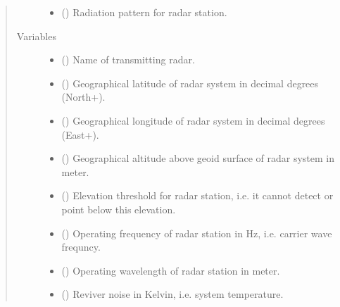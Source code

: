 \documentclass[letterpaper,10pt,english]{sphinxmanual}
\begin{document}
\begin{fulllineitems}
\begin{quote}
\begin{description}
\begin{itemize}
\item {} 
 ({\hyperref[\detokenize{modules/antenna:antenna.BeamPattern}]{}}) \textendash{} Radiation pattern for radar station.

\end{itemize}

\item[{Variables}] \leavevmode\begin{itemize}
\item {} 
 () \textendash{} Name of transmitting radar.

\item {} 
 () \textendash{} Geographical latitude of radar system in decimal degrees  (North+).

\item {} 
 () \textendash{} Geographical longitude of radar system in decimal degrees (East+).

\item {} 
 () \textendash{} Geographical altitude above geoid surface of radar system in meter.

\item {} 
 () \textendash{} Elevation threshold for radar station, i.e. it cannot detect or point below this elevation.

\item {} 
 () \textendash{} Operating frequency of radar station in Hz, i.e. carrier wave frequncy.

\item {} 
 () \textendash{} Operating wavelength of radar station in meter.

\item {} 
 () \textendash{} Reviver noise in Kelvin, i.e. system temperature.


\end{itemize}
\end{description}
\end{quote}
\end{fulllineitems}
\end{document}
